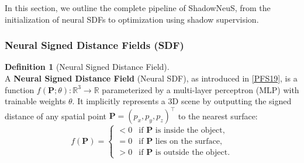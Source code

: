 \documentclass[12pt]{article}
\theoremstyle{definition}
\newtheorem{definition}{Definition}[subsection]
\begin{document}
In this section, we outline the complete pipeline of ShadowNeuS, from the initialization of neural SDFs to optimization using shadow supervision.

\subsubsection{Neural Signed Distance Fields (SDF)} \label{sec:neural_sdf}

\begin{definition}[Neural Signed Distance Field] \label{def:neural_sdf} ~\\
A \textbf{Neural Signed Distance Field} (Neural SDF), as introduced in \hyperlink{[PFS19]}{[PFS19]}, is a function $f(\mathbf{P}; \theta): \mathbb{R}^3 \to \mathbb{R}$ parameterized by a multi-layer perceptron (MLP) with trainable weights $\theta$. It implicitly represents a 3D scene by outputting the signed distance of any spatial point $\mathbf{P} = (p_x, p_y, p_z)^\top$ to the nearest surface:
\[
f(\mathbf{P}) =
\begin{cases}
< 0 & \text{if } \mathbf{P} \text{ is inside the object}, \\
= 0 & \text{if } \mathbf{P} \text{ lies on the surface}, \\
> 0 & \text{if } \mathbf{P} \text{ is outside the object}.
\end{cases}
\]
\end{definition}
\end{document}
